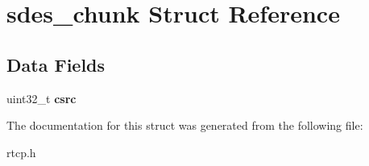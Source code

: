 \section{sdes\+\_\+chunk Struct Reference}
\label{structsdes__chunk}
\subsection*{Data Fields}
\begin{DoxyCompactItemize}
\item 
\mbox{\label{structsdes__chunk_a11f378ca6efb23662aac552df27bc461}} 
uint32\+\_\+t {\bfseries csrc}
\end{DoxyCompactItemize}


The documentation for this struct was generated from the following file\+:\begin{DoxyCompactItemize}
\item 
rtcp.\+h\end{DoxyCompactItemize}
